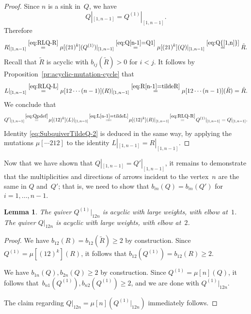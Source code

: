\documentclass[11pt, letterpaper]{amsart}
\newtheorem{lemma}[theorem]{Lemma}
\theoremstyle{definition}
\numberwithin{equation}{section}
\newcommand{\T}[2]{\mu[#1](#2)} %
\begin{document}
\begin{proof}%
Since $n$ is a sink in~$Q$, we have 
\begin{equation}
\label{eq:Q[n-1]=Q1}
Q|_{[1,n-1]}=Q^{(1)}|_{[1,n-1]}.
\end{equation}
Therefore
\begin{equation}
\label{eq:R[n-1]=tildeR}
R|_{[1,n-1]}\stackrel{\eqref{eq:RLQ-R}}{=}\T{(21)^k}{Q^{(1)}}|_{[1,n-1]}
\stackrel{\eqref{eq:Q[n-1]=Q1}}{=}\T{(21)^k}{Q}|_{[1,n-1]}\stackrel{\eqref{eq:Q{[1,n]}}}{=}\tilde R. 
\end{equation}
Recall that $\tilde R$ is acyclic with $b_{ij}(\tilde R)>0$ for $i<j$. 
It follows by Proposition~\ref{pr:acyclic-mutation-cycle} that
\begin{equation}
\label{eq:L[n-1]=tildeL}
L|_{[1, n-1]}\stackrel{\eqref{eq:RLQ-L}}{=}\T{12\cdots(n-1)}{R}|_{[1,n-1]}
\stackrel{\eqref{eq:R[n-1]=tildeR}}{=}\T{12\cdots(n-1)}{\tilde R}=\tilde R .
\end{equation}
We conclude that
\begin{equation*}
Q'|_{[1, n-1]}
\!\stackrel{\eqref{eq:Qpdef}}{=}\!   \T{(12)^k}{L}|_{[1, n-1]}
\!\stackrel{\eqref{eq:L[n-1]=tildeL}}{=\!\!=}\!   \T{(12)^k}{R}|_{[1, n-1]}
\!\stackrel{\eqref{eq:RLQ-R}}{=}\!   Q^{(1)}|_{[1,n-1]}=Q|_{[1,n-1]}. 
\end{equation*}
Identity \eqref{eq:SubquiverTildeQ-2} is deduced in the same way, by applying the mutations
$\mu[\cdots 212]$ to the identity $L|_{[1,n-1]}\!=\!R|_{[1, n-1]}$. 
\end{proof}

Now that we have shown that $Q|_{[1,n-1]}=Q'|_{[1, n-1]}$,
it remains to demonstrate that the multiplicities and directions of arrows incident to the vertex~$n$
are the same in $Q$ and~$Q'$; that is, we need to show that $b_{in}(Q)=b_{in}(Q')$ for $i=1,\dots,n-1$. 

\begin{lemma}
\label{lem:Subquiver12nStart} 
The quiver $Q^{(1)}|_{12n}$ is acyclic with large weights, with elbow at~$1$. \\
The quiver $Q|_{12n}$ is acyclic with large weights, with elbow at~$2$.
\end{lemma}

\begin{proof}
We have $b_{12}(R) =b_{12}(\tilde R)\ge 2$ by construction. 
Since $Q^{(1)}=\T{(12)^k}{R}$, it follows that $b_{12}(Q^{(1)})=b_{12}(R)\ge 2$. 

We have $b_{1n}(Q),b_{2n}(Q)\ge 2$ by construction.
Since $Q^{(1)}=\T{n}{Q}$, it follows that~$b_{n1}(Q^{(1)}), b_{n2}(Q^{(1)})\ge 2$, 
and we are done with $Q^{(1)}|_{12n}$. 

The claim regarding $Q|_{12n}=\T{n}{Q^{(1)}|_{12n}}$ immediately follows. 
\end{proof}
\end{document}
